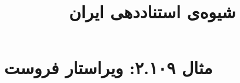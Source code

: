 \documentclass[a4paper,10pt]{article}
\begin{document}
\title{شیوه‌ی استناددهی ایران
 }
\author{}
\date{}
\maketitle



\section*{مثال ۲.۱۰۹: ویراستار فروست}

\cite{استوت1999}\\
\cite{howell1998}\\






\end{document}
